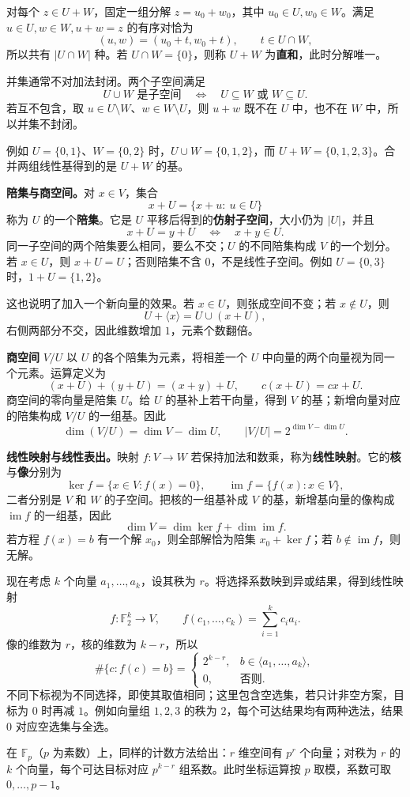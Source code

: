 对每个 $z\in U+W$，固定一组分解 $z=u_0+w_0$，其中 $u_0\in U,w_0\in W$。满足 $u\in U,w\in W,u+w=z$ 的有序对恰为
\[
(u,w)=(u_0+t,w_0+t),\qquad t\in U\cap W,
\]
所以共有 $|U\cap W|$ 种。若 $U\cap W=\{0\}$，则称 $U+W$ 为\textbf{直和}，此时分解唯一。

并集通常不对加法封闭。两个子空间满足
\[
U\cup W\text{ 是子空间}\quad\Longleftrightarrow\quad
U\subseteq W\text{ 或 }W\subseteq U.
\]
若互不包含，取 $u\in U\setminus W$、$w\in W\setminus U$，则 $u+w$ 既不在 $U$ 中，也不在 $W$ 中，所以并集不封闭。

例如 $U=\{0,1\}$、$W=\{0,2\}$ 时，$U\cup W=\{0,1,2\}$，而 $U+W=\{0,1,2,3\}$。合并两组线性基得到的是 $U+W$ 的基。

\textbf{陪集与商空间。}对 $x\in V$，集合
\[
x+U=\{x+u:\ u\in U\}
\]
称为 $U$ 的一个\textbf{陪集}。它是 $U$ 平移后得到的\textbf{仿射子空间}，大小仍为 $|U|$，并且
\[
x+U=y+U\quad\Longleftrightarrow\quad x+y\in U.
\]
同一子空间的两个陪集要么相同，要么不交；$U$ 的不同陪集构成 $V$ 的一个划分。若 $x\in U$，则 $x+U=U$；否则陪集不含 $0$，不是线性子空间。例如 $U=\{0,3\}$ 时，$1+U=\{1,2\}$。

这也说明了加入一个新向量的效果。若 $x\in U$，则张成空间不变；若 $x\notin U$，则
\[
U+\langle x\rangle=U\cup(x+U),
\]
右侧两部分不交，因此维数增加 $1$，元素个数翻倍。

\textbf{商空间} $V/U$ 以 $U$ 的各个陪集为元素，将相差一个 $U$ 中向量的两个向量视为同一个元素。运算定义为
\[
(x+U)+(y+U)=(x+y)+U,\qquad c(x+U)=cx+U.
\]
商空间的零向量是陪集 $U$。给 $U$ 的基补上若干向量，得到 $V$ 的基；新增向量对应的陪集构成 $V/U$ 的一组基。因此
\[
\dim(V/U)=\dim V-\dim U,\qquad |V/U|=2^{\dim V-\dim U}.
\]

\textbf{线性映射与线性表出。}映射 $f:V\to W$ 若保持加法和数乘，称为\textbf{线性映射}。它的\textbf{核}与\textbf{像}分别为
\[
\ker f=\{x\in V:f(x)=0\},\qquad
\operatorname{im}f=\{f(x):x\in V\},
\]
二者分别是 $V$ 和 $W$ 的子空间。把核的一组基补成 $V$ 的基，新增基向量的像构成 $\operatorname{im}f$ 的一组基，因此
\[
\dim V=\dim\ker f+\dim\operatorname{im}f.
\]
若方程 $f(x)=b$ 有一个解 $x_0$，则全部解恰为陪集 $x_0+\ker f$；若 $b\notin\operatorname{im}f$，则无解。

现在考虑 $k$ 个向量 $a_1,\ldots,a_k$，设其秩为 $r$。将选择系数映到异或结果，得到线性映射
\[
f:\mathbb F_2^k\to V,\qquad f(c_1,\ldots,c_k)=\sum_{i=1}^k c_i a_i.
\]
像的维数为 $r$，核的维数为 $k-r$，所以
\[
\#\{c:f(c)=b\}=\begin{cases}
2^{k-r},&b\in\langle a_1,\ldots,a_k\rangle,\\
0,&\text{否则}.
\end{cases}
\]
不同下标视为不同选择，即使其取值相同；这里包含空选集，若只计非空方案，目标为 $0$ 时再减 $1$。例如向量组 $1,2,3$ 的秩为 $2$，每个可达结果均有两种选法，结果 $0$ 对应空选集与全选。

在 $\mathbb F_p$（$p$ 为素数）上，同样的计数方法给出：$r$ 维空间有 $p^r$ 个向量；对秩为 $r$ 的 $k$ 个向量，每个可达目标对应 $p^{k-r}$ 组系数。此时坐标运算按 $p$ 取模，系数可取 $0,\ldots,p-1$。
